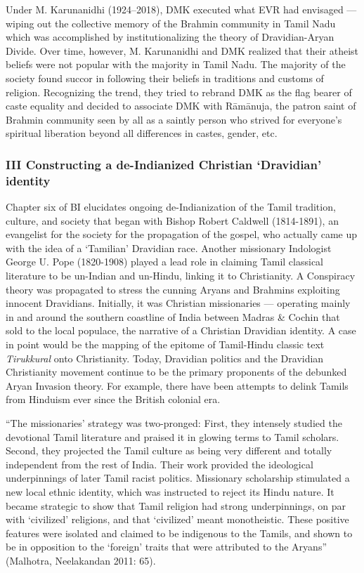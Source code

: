 Under M. Karunanidhi (1924–2018), DMK executed what EVR had envisaged — wiping out the collective memory of the Brahmin community in Tamil Nadu which was accomplished by institutionalizing the theory of Dravidian-Aryan Divide. Over time, however, M. Karunanidhi and DMK realized that their atheist beliefs were not popular with the majority in Tamil Nadu. The majority of the society found succor in following their beliefs in traditions and customs of religion. Recognizing the trend, they tried to rebrand DMK as the flag bearer of caste equality and decided to associate DMK with Rāmānuja, the patron saint of Brahmin community seen by all as a saintly person who strived for everyone’s spiritual liberation beyond all differences in castes, gender, etc.


\subsubsection*{III Constructing a de-Indianized Christian ‘Dravidian’ identity }

Chapter six of BI elucidates ongoing de-Indianization of the Tamil tradition, culture, and society that began with Bishop Robert Caldwell (1814-1891), an evangelist for the society for the propagation of the gospel, who actually came up with the idea of a ‘Tamilian’ Dravidian race. Another missionary Indologist George U. Pope (1820-1908) played a lead role in claiming Tamil classical literature to be un-Indian and un-Hindu, linking it to Christianity. A Conspiracy theory was propagated to stress the cunning Aryans and Brahmins exploiting innocent Dravidians. Initially, it was Christian missionaries — operating mainly in and around the southern coastline of India between Madras \& Cochin that sold to the local populace, the narrative of a Christian Dravidian identity. A case in point would be the mapping of the epitome of Tamil-Hindu classic text \textit{Tirukkural} onto Christianity. Today, Dravidian politics and the Dravidian Christianity movement continue to be the primary proponents of the debunked Aryan Invasion theory. For example, there have been attempts to delink Tamils from Hinduism ever since the British colonial era.

\begin{myquote}
“The missionaries’ strategy was two-pronged: First, they intensely studied the devotional Tamil literature and praised it in glowing terms to Tamil scholars. Second, they projected the Tamil culture as being very different and totally independent from the rest of India. Their work provided the ideological underpinnings of later Tamil racist politics. Missionary scholarship stimulated a new local ethnic identity, which was instructed to reject its Hindu nature. It became strategic to show that Tamil religion had strong underpinnings, on par with ‘civilized’ religions, and that ‘civilized’ meant monotheistic. These positive features were isolated and claimed to be indigenous to the Tamils, and shown to be in opposition to the ‘foreign’ traits that were attributed to the Aryans” (Malhotra, Neelakandan 2011: 65).
\end{myquote}


